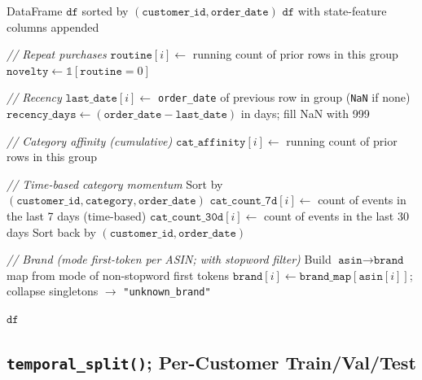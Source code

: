 \documentclass[11pt,a4paper]{article}
\begin{document}
\begin{algorithm}[H]
\caption{\textsc{ComputeStateFeatures}}\label{alg:compute-state-features}
\begin{algorithmic}[1]
\Require DataFrame $\texttt{df}$ sorted by $(\texttt{customer\_id}, \texttt{order\_date})$
\Ensure $\texttt{df}$ with state-feature columns appended

\Statex \textit{// Repeat purchases}
    \State \hspace{2em} $\texttt{routine}[i] \gets$ running count of prior rows in this group
\EndFor
\State $\texttt{novelty} \gets \mathbb{1}[\texttt{routine} = 0]$

\Statex \textit{// Recency}
    \State \hspace{2em} $\texttt{last\_date}[i] \gets$ \texttt{order\_date} of previous row in group (\texttt{NaN} if none)
\EndFor
\State $\texttt{recency\_days} \gets (\texttt{order\_date} - \texttt{last\_date})$ in days; fill NaN with 999

\Statex \textit{// Category affinity (cumulative)}
    \State \hspace{2em} $\texttt{cat\_affinity}[i] \gets$ running count of prior rows in this group
\EndFor

\Statex \textit{// Time-based category momentum}
\State Sort by $(\texttt{customer\_id}, \texttt{category}, \texttt{order\_date})$
    \State \hspace{2em} $\texttt{cat\_count\_7d}[i] \gets$ count of events in the last 7 days (time-based)
    \State \hspace{2em} $\texttt{cat\_count\_30d}[i] \gets$ count of events in the last 30 days
\EndFor
\State Sort back by $(\texttt{customer\_id}, \texttt{order\_date})$

\Statex \textit{// Brand (mode first-token per ASIN; with stopword filter)}
\State Build $\texttt{asin} \to \texttt{brand}$ map from mode of non-stopword first tokens
\State $\texttt{brand}[i] \gets \texttt{brand\_map}[\texttt{asin}[i]]$; collapse singletons $\to$ \texttt{"unknown\_brand"}

\State \Return $\texttt{df}$
\end{algorithmic}
\end{algorithm}


\subsection{\texttt{temporal\_split()}; Per-Customer Train/Val/Test}
\end{document}
